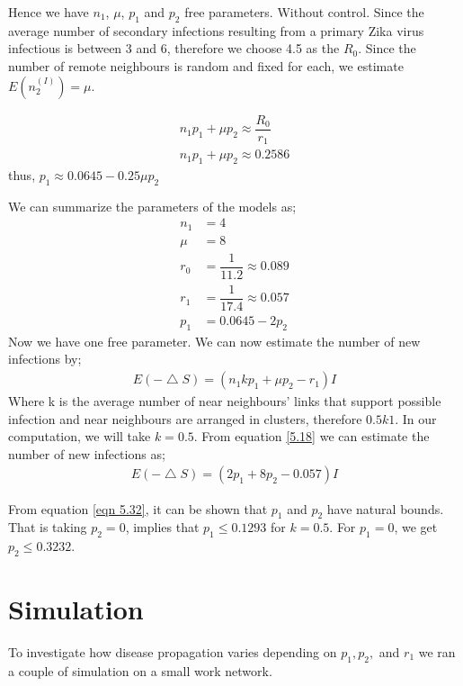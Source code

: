 Hence we have $n_1$, $\mu$, $p_1$ and $p_2$ free parameters. Without control. Since the average number of secondary infections resulting from a primary  Zika  virus infectious is between 3 and 6, therefore we choose 4.5 as the $R_0$. Since the number of remote neighbours is random and fixed for each, we estimate $E (n^ {(I)} _2) = \mu$.

\begin{align}
n_1 p_1 + \mu p_2 \approx \dfrac{R_0}{r_1} 
\\ n_1 p_1 + \mu p_2 \approx 0.2586 \label{eqn 5.32}
\end{align}
thus, 
$p_1 \approx   0.0645- 0.25 \mu p_2$

We can summarize the parameters of the models as;
\begin{align}
n_1 &= 4 \\
\mu &= 8 \\
r_0 &= \dfrac{1}{11.2} \approx 0.089 \\
r_1 &= \dfrac{1}{17.4} \approx 0.057 \\
p_1 &= 0.0645 - 2 p_2 \label{eqn 5.1.7}
\end{align}
Now we have one free parameter. We can now estimate the number of new infections by;
\begin{align}
E(- \bigtriangleup S) = (n_1 k p_1 + \mu p_2 - r_1) I \label{5.18}
\end{align}
Where k is the average number of near neighbours' links that support possible infection and near neighbours are arranged in clusters, therefore $0.5 k 1$.  In our computation, we will take $k = 0.5$. From equation \ref{5.18} we can estimate the number of new infections as;
\begin{align}
E(- \bigtriangleup S) = (2 p_1 + 8 p_2 - 0.057) I  \label{5.1.9}
\end{align}
 
From equation \ref{eqn 5.32}, it can be shown that $p_1$ and $p_2$ have natural bounds. That is taking $p_2 = 0$, implies that $p_1 \leq 0.1293$ for $k =0. 5$. For $p_1 = 0$, we get $p_2 \leq 0.3232$.
\section{Simulation}
To investigate how disease propagation varies depending on $p_1, p_2, $ and $r_1$ we ran a couple of simulation on a small work network.
 
